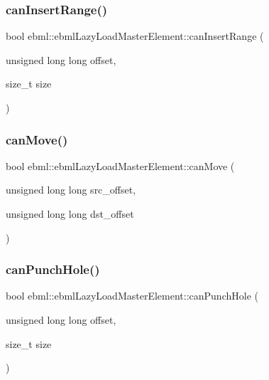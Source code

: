 \subsubsection{\texorpdfstring{can\+Insert\+Range()}{canInsertRange()}}
{\footnotesize\ttfamily bool ebml\+::ebml\+Lazy\+Load\+Master\+Element\+::can\+Insert\+Range (\begin{DoxyParamCaption}\item[{unsigned long long}]{offset,  }\item[{size\+\_\+t}]{size }\end{DoxyParamCaption})}

\mbox{\label{classebml_1_1ebmlLazyLoadMasterElement_a269975b1519259599b771dad3607f13a}} 
\subsubsection{\texorpdfstring{can\+Move()}{canMove()}}
{\footnotesize\ttfamily bool ebml\+::ebml\+Lazy\+Load\+Master\+Element\+::can\+Move (\begin{DoxyParamCaption}\item[{unsigned long long}]{src\+\_\+offset,  }\item[{unsigned long long}]{dst\+\_\+offset }\end{DoxyParamCaption})}

\mbox{\label{classebml_1_1ebmlLazyLoadMasterElement_adbc3d8af9eb656d04d2de5ee1686b3eb}} 
\subsubsection{\texorpdfstring{can\+Punch\+Hole()}{canPunchHole()}}
{\footnotesize\ttfamily bool ebml\+::ebml\+Lazy\+Load\+Master\+Element\+::can\+Punch\+Hole (\begin{DoxyParamCaption}\item[{unsigned long long}]{offset,  }\item[{size\+\_\+t}]{size }\end{DoxyParamCaption})}

